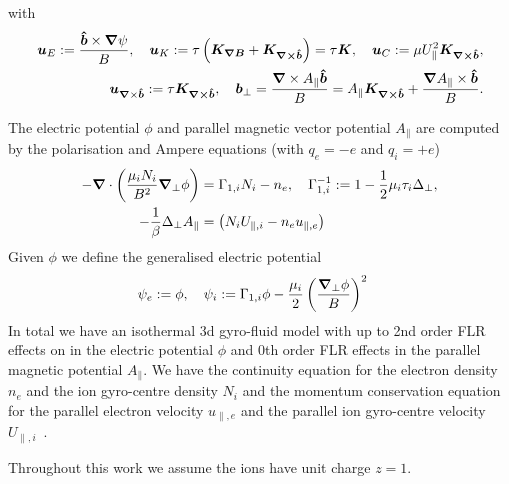 with
\begin{align}
\vec u_E := \frac{\bhat\times\vn\psi}{B},\quad
\vec u_{K} := \tau \left(\vec{ K_{\vn B}} + \vec{ K_{\vn\times\bhat}}\right)=\tau\vec{ K}  ,\quad  %
\vec u_C := \mu U_\parallel^2\vec{ K_{\vn\times\bhat}},\nonumber\\
\vec u_{\vn\times\bhat} := \tau\vec{ K_{\vn\times\bhat}},\quad
{\vec b}_\perp = \frac{\vn\times A_\parallel \bhat}{B} = A_\parallel \vec{ K_{\vn\times\bhat}} + \frac{\vn A_\parallel \times \bhat}{B}.
\label{}
\end{align}

The electric potential \(\phi\) and parallel magnetic vector potential \(A_\parallel\) are
computed by the polarisation and Ampere equations (with $q_e=-e$ and $q_i=+e$)
\begin{align}
 -{\boldsymbol{\nabla}}\cdot\left(\frac{\mu_iN_i}{B^2} {\boldsymbol{\nabla}}_{\perp} \phi\right) &=  \Gamma_{1,i} N_i -n_e, \quad \Gamma_{1,i}^{-1} := 1-\frac{1}{2}\mu_i\tau_i\Delta_\perp , \\
  -\frac{1}{\beta} \Delta_\perp A_\parallel &= \left(N_i U_{\parallel,i}-n_e u_{\parallel,e} \right)
  \label{eq:polarisation_dimensional}
\end{align}
Given $\phi$ we define the generalised electric potential
\begin{align}
    \psi_e := \phi,\quad \psi_i&:= \Gamma_{1,i} \phi - \frac{\mu_i }{2}\left(\frac{{\boldsymbol{\nabla}}_{\perp}\phi}{B}\right)^2
\end{align}
In total
we have an isothermal 3d gyro-fluid model with up to 2nd order FLR effects
on in the electric potential $\phi$ and 0th order FLR effects in the parallel magnetic
potential $A_\parallel$.
We have the continuity equation for the electron density \(n_e\) and the ion gyro-centre
density \(N_i\) and the momentum conservation equation for
the parallel electron velocity \(u_{\parallel,e}\) and the parallel ion gyro-centre velocity \(U_{\parallel,i}\)~\cite{WiesenbergerPhD, HeldPhD}.
\begin{tcolorbox}[title=Note]
    Throughout this work we assume the ions have unit charge $z=1$.
\end{tcolorbox}
